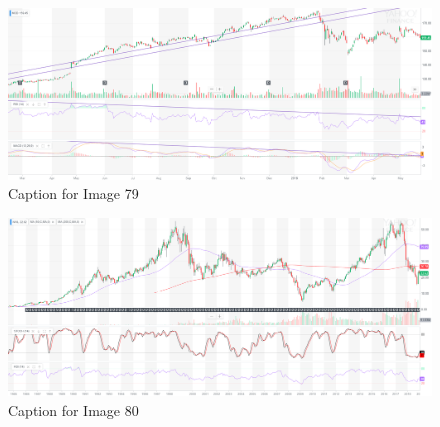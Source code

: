\documentclass{article}
\begin{document}
\vspace{10pt}

\begin{figure}[!htb]
    \centering
    \includegraphics[width=\textwidth]{imgs/79.png}
    \caption{Caption for Image 79}
\end{figure}

\vspace{10pt}

\begin{figure}[!htb]
    \centering
    \includegraphics[width=\textwidth]{imgs/80.png}
    \caption{Caption for Image 80}
\end{figure}

\vspace{10pt}
\end{document}
